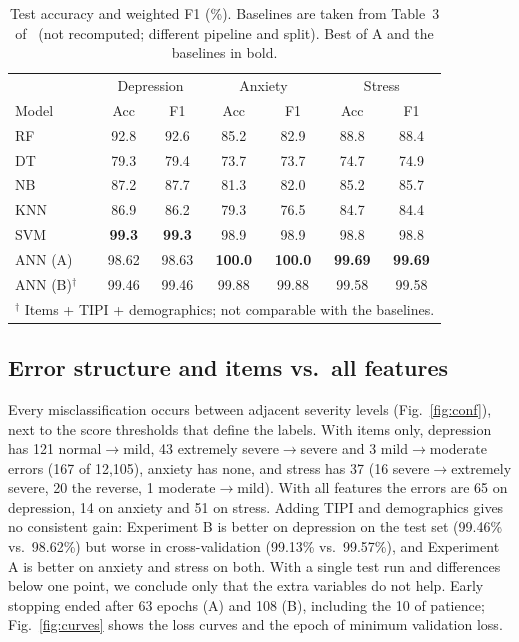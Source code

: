 \documentclass[conference,compsoc]{IEEEtran}
\begin{document}
\begin{table}[!t]
\centering
\caption{Test accuracy and weighted F1 (\%). Baselines are taken from Table~3 of~\cite{shams} (not recomputed; different pipeline and split). Best of A and the baselines in bold.}
\label{tab:baselines}
\footnotesize
\setlength{\tabcolsep}{3.5pt}
\begin{tabular}{l cc cc cc}
\hline
 & \multicolumn{2}{c}{Depression} & \multicolumn{2}{c}{Anxiety} & \multicolumn{2}{c}{Stress}\\
Model & Acc & F1 & Acc & F1 & Acc & F1\\
\hline
RF  & 92.8 & 92.6 & 85.2 & 82.9 & 88.8 & 88.4\\
DT  & 79.3 & 79.4 & 73.7 & 73.7 & 74.7 & 74.9\\
NB  & 87.2 & 87.7 & 81.3 & 82.0 & 85.2 & 85.7\\
KNN & 86.9 & 86.2 & 79.3 & 76.5 & 84.7 & 84.4\\
SVM & \textbf{99.3} & \textbf{99.3} & 98.9 & 98.9 & 98.8 & 98.8\\
\hline
ANN (A) & 98.62 & 98.63 & \textbf{100.0} & \textbf{100.0} & \textbf{99.69} & \textbf{99.69}\\
ANN (B)$^\dagger$ & 99.46 & 99.46 & 99.88 & 99.88 & 99.58 & 99.58\\
\hline
\multicolumn{7}{l}{\scriptsize $^\dagger$ Items + TIPI + demographics; not comparable with the baselines.}
\end{tabular}
\end{table}

\subsection{Error structure and items vs.\ all features}

Every misclassification occurs between adjacent severity levels (Fig.~\ref{fig:conf}), next to the score thresholds that define the labels.
With items only, depression has 121 normal$\to$mild, 43 extremely severe$\to$severe and 3 mild$\to$moderate errors (167 of 12,105), anxiety has none, and stress has 37 (16 severe$\to$extremely severe, 20 the reverse, 1 moderate$\to$mild).
With all features the errors are 65 on depression, 14 on anxiety and 51 on stress.
Adding TIPI and demographics gives no consistent gain: Experiment B is better on depression on the test set (99.46\% vs.\ 98.62\%) but worse in cross-validation (99.13\% vs.\ 99.57\%), and Experiment A is better on anxiety and stress on both.
With a single test run and differences below one point, we conclude only that the extra variables do not help.
Early stopping ended after 63 epochs (A) and 108 (B), including the 10 of patience; Fig.~\ref{fig:curves} shows the loss curves and the epoch of minimum validation loss.
\end{document}
